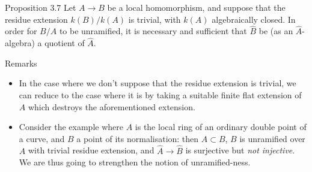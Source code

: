 \begin{itenv}{Proposition 3.7}
\label{I.3.7}
  Let $A\to B$ be a local homomorphism, and suppose that the residue extension $k(B)/k(A)$ is trivial, with $k(A)$ algebraically closed.
  In order for $B/A$ to be unramified, it is necessary and sufficient that $\hat{B}$ be (as an $\hat{A}$-algebra) a quotient of $\hat{A}$.
\end{itenv}

\begin{rmenv}{Remarks}
  \begin{itemize}
    \item In the case where we don't suppose that the residue extension is trivial, we can reduce to the case where it is by taking a suitable finite flat extension of $A$ which destroys the aforementioned extension.
    \item Consider the example where $A$ is the local ring of an ordinary double point of a curve, and $B$ a point of its normalisation:
      then $A\subset B$, $B$ is unramified over $A$ with trivial residue extension,
      and $\hat{A}\to\hat{B}$ is surjective but \emph{not injective}.
    We are thus going to strengthen the notion of unramified-ness.
  \end{itemize}
\end{rmenv}
